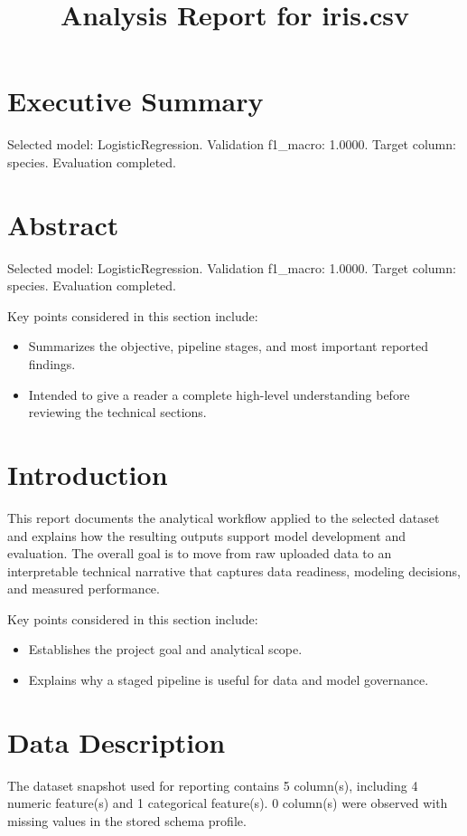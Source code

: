 \documentclass[11pt]{article}
\title{Analysis Report for iris.csv}
\date{}
\begin{document}
\maketitle


\section{Executive Summary}
Selected model: LogisticRegression. Validation f1\_macro: 1.0000. Target column: species. Evaluation completed.

\section{Abstract}
Selected model: LogisticRegression. Validation f1\_macro: 1.0000. Target column: species. Evaluation completed.

Key points considered in this section include:

\begin{itemize}
\item Summarizes the objective, pipeline stages, and most important reported findings.
\item Intended to give a reader a complete high-level understanding before reviewing the technical sections.
\end{itemize}


\section{Introduction}
This report documents the analytical workflow applied to the selected dataset and explains how the resulting outputs support model development and evaluation. The overall goal is to move from raw uploaded data to an interpretable technical narrative that captures data readiness, modeling decisions, and measured performance.

Key points considered in this section include:

\begin{itemize}
\item Establishes the project goal and analytical scope.
\item Explains why a staged pipeline is useful for data and model governance.
\end{itemize}


\section{Data Description}
The dataset snapshot used for reporting contains 5 column(s), including 4 numeric feature(s) and 1 categorical feature(s). 0 column(s) were observed with missing values in the stored schema profile.
\end{document}
